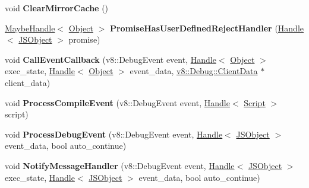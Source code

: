 \begin{DoxyCompactItemize}
\item 
void {\bfseries Clear\+Mirror\+Cache} ()\hypertarget{classv8_1_1internal_1_1_debug_a5d115fa4e3d47c33f07eeb916bb5f212}{}\label{classv8_1_1internal_1_1_debug_a5d115fa4e3d47c33f07eeb916bb5f212}

\item 
\hyperlink{classv8_1_1internal_1_1_maybe_handle}{Maybe\+Handle}$<$ \hyperlink{classv8_1_1internal_1_1_object}{Object} $>$ {\bfseries Promise\+Has\+User\+Defined\+Reject\+Handler} (\hyperlink{classv8_1_1internal_1_1_handle}{Handle}$<$ \hyperlink{classv8_1_1internal_1_1_j_s_object}{J\+S\+Object} $>$ promise)\hypertarget{classv8_1_1internal_1_1_debug_ab847393d3659721c14feb1053919e2e8}{}\label{classv8_1_1internal_1_1_debug_ab847393d3659721c14feb1053919e2e8}

\item 
void {\bfseries Call\+Event\+Callback} (v8\+::\+Debug\+Event event, \hyperlink{classv8_1_1internal_1_1_handle}{Handle}$<$ \hyperlink{classv8_1_1internal_1_1_object}{Object} $>$ exec\+\_\+state, \hyperlink{classv8_1_1internal_1_1_handle}{Handle}$<$ \hyperlink{classv8_1_1internal_1_1_object}{Object} $>$ event\+\_\+data, \hyperlink{classv8_1_1_debug_1_1_client_data}{v8\+::\+Debug\+::\+Client\+Data} $\ast$client\+\_\+data)\hypertarget{classv8_1_1internal_1_1_debug_af0900cb8aa5cdb287b0d3cf53a58c5d1}{}\label{classv8_1_1internal_1_1_debug_af0900cb8aa5cdb287b0d3cf53a58c5d1}

\item 
void {\bfseries Process\+Compile\+Event} (v8\+::\+Debug\+Event event, \hyperlink{classv8_1_1internal_1_1_handle}{Handle}$<$ \hyperlink{classv8_1_1internal_1_1_script}{Script} $>$ script)\hypertarget{classv8_1_1internal_1_1_debug_a472255a82003fe43643c5c553aeff2bf}{}\label{classv8_1_1internal_1_1_debug_a472255a82003fe43643c5c553aeff2bf}

\item 
void {\bfseries Process\+Debug\+Event} (v8\+::\+Debug\+Event event, \hyperlink{classv8_1_1internal_1_1_handle}{Handle}$<$ \hyperlink{classv8_1_1internal_1_1_j_s_object}{J\+S\+Object} $>$ event\+\_\+data, bool auto\+\_\+continue)\hypertarget{classv8_1_1internal_1_1_debug_a9b779323e88ddacee3995d661ef4867f}{}\label{classv8_1_1internal_1_1_debug_a9b779323e88ddacee3995d661ef4867f}

\item 
void {\bfseries Notify\+Message\+Handler} (v8\+::\+Debug\+Event event, \hyperlink{classv8_1_1internal_1_1_handle}{Handle}$<$ \hyperlink{classv8_1_1internal_1_1_j_s_object}{J\+S\+Object} $>$ exec\+\_\+state, \hyperlink{classv8_1_1internal_1_1_handle}{Handle}$<$ \hyperlink{classv8_1_1internal_1_1_j_s_object}{J\+S\+Object} $>$ event\+\_\+data, bool auto\+\_\+continue)\hypertarget{classv8_1_1internal_1_1_debug_ad203684476bea8dc7dded6d1708005e8}{}\label{classv8_1_1internal_1_1_debug_ad203684476bea8dc7dded6d1708005e8}


\end{DoxyCompactItemize}
